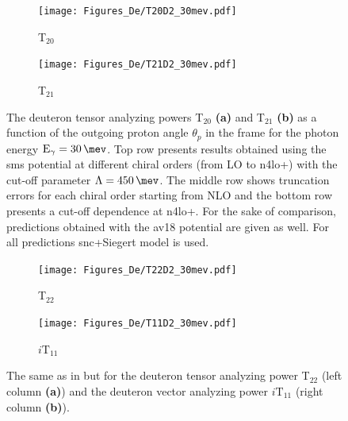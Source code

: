     \begin{figure}[htb]
        \centering
        \begin{subfigure}[b]{0.46\textwidth}
            \caption{T$_{20}$}
            \texttt{[image: Figures\_De/T20D2\_30mev.pdf]}
            \label{T20_30_vert}
        \end{subfigure}
        \begin{subfigure}[b]{0.46\textwidth}
            \caption{T$_{21}$}
            \texttt{[image: Figures\_De/T21D2\_30mev.pdf]}
            \label{T21_30_vert}
        \end{subfigure}
        \caption{The deuteron tensor analyzing powers T$_{20}$  {\bf (a)}
        and T$_{21}$ {\bf (b)}
        as a function of the outgoing proton angle $\theta_p$ in the  frame 
        for the photon energy $\text{E}_\gamma = \SI{30}{\mev}$.
        Top row presents results obtained using the \gls{sms} potential
        at different chiral orders (from LO to \gls{n4lo+}) with the cut-off parameter $\Lambda=\SI{450}{\mev}$.
        The middle row shows truncation errors for each 
        chiral order starting from NLO and
        the bottom row presents a cut-off dependence at \gls{n4lo+}.
        For the sake of comparison, predictions obtained with the \gls{av18} potential are given as well.
        For all predictions \gls{snc}+Siegert model is used.}
        \label{T20_T21_30}
    \end{figure}

    \begin{figure}[htb]
        \centering
        \begin{subfigure}[b]{0.46\textwidth}
            \caption{T$_{22}$}
            \texttt{[image: Figures\_De/T22D2\_30mev.pdf]}
            \label{T22_30_vert}
        \end{subfigure}
        \begin{subfigure}[b]{0.46\textwidth}
            \caption{$i\text{T}_{11}$}
            \texttt{[image: Figures\_De/T11D2\_30mev.pdf]}
            \label{T11_30_vert}
        \end{subfigure}
        \caption{The same as in  but for the deuteron tensor analyzing power
        T$_{22}$ (left column {\bf (a)}) and the deuteron vector analyzing power
        $i\text{T}_{11}$ (right column  {\bf (b)}).}
        \label{T22_T11_30}
    \end{figure}


